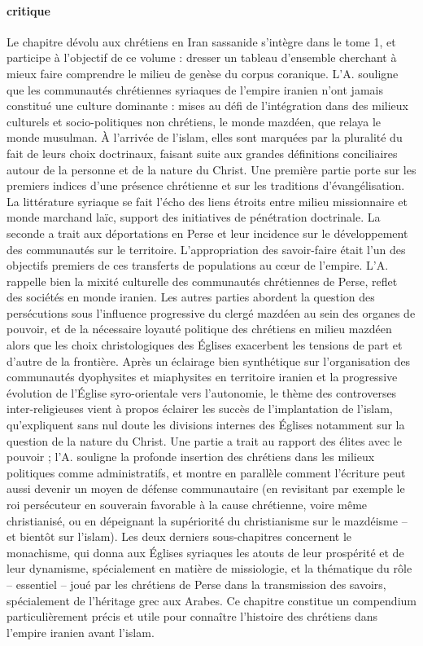 \paragraph{critique} Le chapitre dévolu aux chrétiens en Iran sassanide s’intègre dans le tome 1, et participe à l’objectif de ce volume : dresser un tableau d’ensemble cherchant à mieux faire comprendre le milieu de genèse du corpus coranique. L’A. souligne que les communautés chrétiennes syriaques de l’empire iranien n’ont jamais constitué une culture dominante : mises au défi de l’intégration dans des milieux culturels et socio-politiques non chrétiens, le monde mazdéen, que relaya le monde musulman. À l’arrivée de l’islam, elles sont marquées par la pluralité du fait de leurs choix doctrinaux, faisant suite aux grandes définitions conciliaires autour de la personne et de la nature du Christ. Une première partie porte sur les premiers indices d’une présence chrétienne et sur les traditions d’évangélisation. La littérature syriaque se fait l’écho des liens étroits entre milieu missionnaire et monde marchand laïc, support des initiatives de pénétration doctrinale. La seconde a trait aux déportations en Perse et leur incidence sur le développement des communautés sur le territoire. L’appropriation des savoir-faire était l’un des objectifs premiers de ces transferts de populations au cœur de l’empire. L’A. rappelle bien la mixité culturelle des communautés chrétiennes de Perse, reflet des sociétés en monde iranien. Les autres parties abordent la question des persécutions sous l’influence progressive du clergé mazdéen au sein des organes de pouvoir, et de la nécessaire loyauté politique des chrétiens en milieu mazdéen alors que les choix christologiques des Églises exacerbent les tensions de part et d’autre de la frontière. Après un éclairage bien synthétique sur l’organisation des communautés dyophysites et miaphysites en territoire iranien et la progressive évolution de l’Église syro-orientale vers l’autonomie, le thème des controverses inter-religieuses vient à propos éclairer les succès de l’implantation de l’islam, qu’expliquent sans nul doute les divisions internes des Églises notamment sur la question de la nature du Christ. Une partie a trait au rapport des élites avec le pouvoir ; l’A. souligne la profonde insertion des chrétiens dans les milieux politiques comme administratifs, et montre en parallèle comment l’écriture peut aussi devenir un moyen de défense communautaire (en revisitant par exemple le roi persécuteur en souverain favorable à la cause chrétienne, voire même christianisé, ou en dépeignant la supériorité du christianisme sur le mazdéisme – et bientôt sur l’islam). Les deux derniers sous-chapitres concernent le monachisme, qui donna aux Églises syriaques les atouts de leur prospérité et de leur dynamisme, spécialement en matière de missiologie, et la thématique du rôle – essentiel – joué par les chrétiens de Perse dans la transmission des savoirs, spécialement de l’héritage grec aux Arabes. Ce chapitre constitue un compendium particulièrement précis et utile pour connaître l’histoire des chrétiens dans l’empire iranien avant l’islam.


